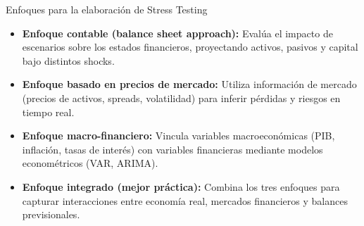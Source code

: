 \documentclass{beamer}
\begin{document}
\begin{frame}{Enfoques para la elaboración de Stress Testing}

\begin{itemize}

\item \textbf{Enfoque contable (balance sheet approach):}  
Evalúa el impacto de escenarios sobre los estados financieros, proyectando activos, pasivos y capital bajo distintos shocks.

\vspace{0.3cm}

\item \textbf{Enfoque basado en precios de mercado:}  
Utiliza información de mercado (precios de activos, spreads, volatilidad) para inferir pérdidas y riesgos en tiempo real.

\vspace{0.3cm}

\item \textbf{Enfoque macro-financiero:}  
Vincula variables macroeconómicas (PIB, inflación, tasas de interés) con variables financieras mediante modelos econométricos (VAR, ARIMA).

\vspace{0.3cm}

\item \textbf{Enfoque integrado (mejor práctica):}  
Combina los tres enfoques para capturar interacciones entre economía real, mercados financieros y balances previsionales.

\end{itemize}

\end{frame}
\end{document}
